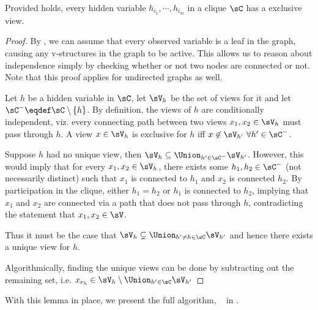 \begin{lemma}
  Provided  holds, every hidden variable
    $h_{i_1}, \cdots, h_{i_m}$ in a clique $\sC$ has a exclusive view.
\end{lemma}
\begin{proof}
  By , we can assume that every observed
  variable is a leaf in the graph, causing any v-structures in the graph
  to be active. This allows us to reason about independence simply by
  checking whether or not two nodes are connected or not. Note that this
  proof applies for undirected graphs as well.

  Let $h$ be a hidden variable in $\sC$, let $\sV_{h}$ be the set of
    views for it and let $\sC^- \eqdef \sC \setminus \{h\}$.
  By definition, the views of $h$ are conditionally independent, viz.
    every connecting path between two views $x_1, x_2 \in \sV_h$ must pass through
    $h$.
  A view $x \in \sV_{h}$ is exclusive for $h$ iff $x \not\in \sV_{h'} ~ \forall h'
  \in \sC^-$.

  Suppose $h$ had no unique view, then $\sV_{h} \subseteq \Union_{h' \in \sC^-} \sV_{h'}$. 
  However, this would imply that for every $x_1, x_2 \in \sV_{h}$, there
    exists some $h_1, h_2 \in \sC^-$ (not necessarily distinct) such that
    $x_1$ is connected to $h_1$ and $x_2$ is connected $h_2$.
  By participation in the clique, either $h_1 = h_2$ or $h_1$ is
    connected to $h_2$, implying that $x_1$ and $x_2$ are connected
    via a path that does not pass through $h$, contradicting the
    statement that $x_1, x_2 \in \sV$. 
    
  Thus it must be the case that $\sV_{h} \subsetneq \Union_{h' \neq
    h \in \sC} \sV_{h'}$ and hence there exists a unique view for $h$.

  Algorithmically, finding the unique views can be done by subtracting
    out the remaining set, i.e. $x_{v_h} \in \sV_h \setminus \Union_{h'
    \in \sC} \sV_{h'}$
\end{proof}

With this lemma in place, we present the full algorithm, \LearnMarginals~
in .

